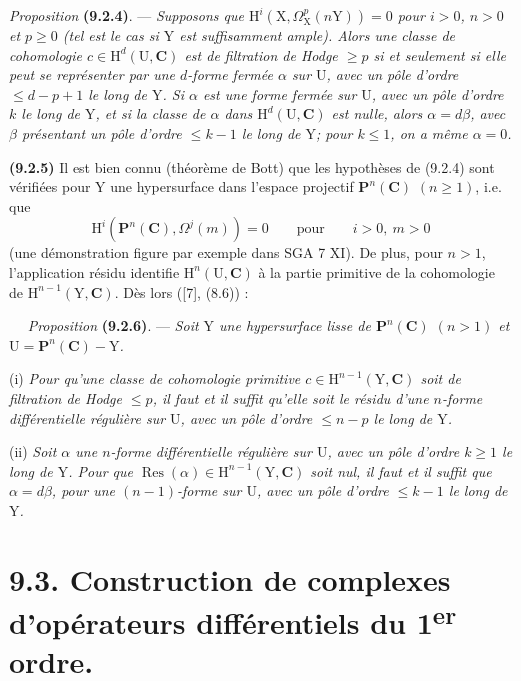 \documentclass[11pt,leqno]{article}
\newcommand{\Page}[1]{\ifvmode\noindent\else\unskip\ \fi{\footnotesize\textcolor{gray}{[p.\,#1]}}\ \ignorespaces}
\begin{document}
\textit{Proposition} \textbf{(9.2.4)}. — \textit{Supposons que \(\mathrm{H}^{i}(\mathrm{X},\Omega_{\mathrm{X}}^{p}(n\mathrm{Y}))=0\) pour \(i>0\), \(n>0\) et \(p\geq0\) (tel est le cas si \(\mathrm{Y}\) est suffisamment ample). Alors une classe de cohomologie \(c\in\mathrm{H}^{d}(\mathrm{U},\mathbf{C})\) est de filtration de Hodge \(\geq p\) si et seulement si elle peut se représenter par une \(d\)-forme fermée \(\alpha\) sur \(\mathrm{U}\), avec un pôle d’ordre \(\leq d-p+1\) le long de \(\mathrm{Y}\). Si \(\alpha\) est une forme fermée sur \(\mathrm{U}\), avec un pôle d’ordre \(k\) le long de \(\mathrm{Y}\), et si la classe de \(\alpha\) dans \(\mathrm{H}^{d}(\mathrm{U},\mathbf{C})\) est nulle, alors \(\alpha=d\beta\), avec \(\beta\) présentant un pôle d’ordre \(\leq k-1\) le long de \(\mathrm{Y}\); pour \(k\leq1\), on a même \(\alpha=0\).}

\textbf{(9.2.5)} Il est bien connu (théorème de Bott) que les hypothèses de (9.2.4) sont vérifiées pour \(\mathrm{Y}\) une hypersurface dans l’espace projectif \(\mathbf{P}^{n}(\mathbf{C})\) \((n\geq1)\), i.e. que
\[
\mathrm{H}^{i}(\mathbf{P}^{n}(\mathbf{C}),\Omega^{j}(m))=0
\qquad\text{pour}\qquad i>0,\ m>0
\]
(une démonstration figure par exemple dans SGA 7 XI). De plus, pour \(n>1\), l’application résidu identifie \(\mathrm{H}^{n}(\mathrm{U},\mathbf{C})\) à la partie primitive de la cohomologie de \(\mathrm{H}^{n-1}(\mathrm{Y},\mathbf{C})\). Dès lors ([7], (8.6)) :

\Page{50}
\textit{Proposition} \textbf{(9.2.6)}. — \textit{Soit \(\mathrm{Y}\) une hypersurface lisse de \(\mathbf{P}^{n}(\mathbf{C})\) \((n>1)\) et \(\mathrm{U}=\mathbf{P}^{n}(\mathbf{C})-\mathrm{Y}\).}

(i) \textit{Pour qu’une classe de cohomologie primitive \(c\in\mathrm{H}^{n-1}(\mathrm{Y},\mathbf{C})\) soit de filtration de Hodge \(\leq p\), il faut et il suffit qu’elle soit le résidu d’une \(n\)-forme différentielle régulière sur \(\mathrm{U}\), avec un pôle d’ordre \(\leq n-p\) le long de \(\mathrm{Y}\).}

(ii) \textit{Soit \(\alpha\) une \(n\)-forme différentielle régulière sur \(\mathrm{U}\), avec un pôle d’ordre \(k\geq1\) le long de \(\mathrm{Y}\). Pour que \(\operatorname{Res}(\alpha)\in\mathrm{H}^{n-1}(\mathrm{Y},\mathbf{C})\) soit nul, il faut et il suffit que \(\alpha=d\beta\), pour une \((n-1)\)-forme sur \(\mathrm{U}\), avec un pôle d’ordre \(\leq k-1\) le long de \(\mathrm{Y}\).}

\section*{9.3. Construction de complexes d’opérateurs différentiels du 1\textsuperscript{er} ordre.}
\end{document}
